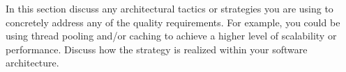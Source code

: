 In this section discuss any architectural tactics or strategies you are using to concretely address any
of the quality requirements.
For example, you could be using thread pooling and/or caching to achieve a higher level of
scalability or performance.
Discuss how the strategy is realized within your software architecture.